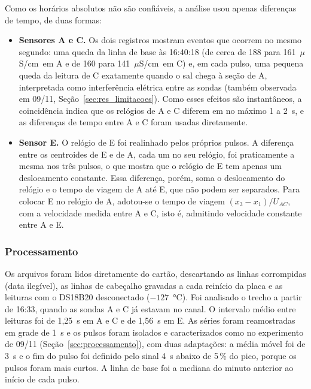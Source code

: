 \documentclass[12pt,a4paper]{article}
\providecommand{\uScm}{\ensuremath{\mu}S/cm}
\begin{document}
Como os horários absolutos não são confiáveis, a análise usou apenas diferenças de tempo, de duas formas:
\begin{itemize}
  \item \textbf{Sensores A e C.} Os dois registros mostram eventos que ocorrem no mesmo segundo: uma queda da linha de base às 16:40:18 (de cerca de 188 para 161~\uScm\ em A e de 160 para 141~\uScm\ em C) e, em cada pulso, uma pequena queda da leitura de C exatamente quando o sal chega à seção de A, interpretada como interferência elétrica entre as sondas (também observada em 09/11, Seção~\ref{sec:res_limitacoes}). Como esses efeitos são instantâneos, a coincidência indica que os relógios de A e C diferem em no máximo 1 a 2~s, e as diferenças de tempo entre A e C foram usadas diretamente.
  \item \textbf{Sensor E.} O relógio de E foi realinhado pelos próprios pulsos. A diferença entre os centroides de E e de A, cada um no seu relógio, foi praticamente a mesma nos três pulsos, o que mostra que o relógio de E tem apenas um deslocamento constante. Essa diferença, porém, soma o deslocamento do relógio e o tempo de viagem de A até E, que não podem ser separados. Para colocar E no relógio de A, adotou-se o tempo de viagem $(x_3 - x_1)/U_{AC}$, com a velocidade medida entre A e C, isto é, admitindo velocidade constante entre A e E.
\end{itemize}

\subsubsection{Processamento}
Os arquivos foram lidos diretamente do cartão, descartando as linhas corrompidas (data ilegível), as linhas de cabeçalho gravadas a cada reinício da placa e as leituras com o DS18B20 desconectado ($-127$~°C). Foi analisado o trecho a partir de 16:33, quando as sondas A e C já estavam no canal. O intervalo médio entre leituras foi de 1,25~s em A e C e de 1,56~s em E. As séries foram reamostradas em grade de 1~s e os pulsos foram isolados e caracterizados como no experimento de 09/11 (Seção~\ref{sec:processamento}), com duas adaptações: a média móvel foi de 3~s e o fim do pulso foi definido pelo sinal 4~s abaixo de 5\,\% do pico, porque os pulsos foram mais curtos. A linha de base foi a mediana do minuto anterior ao início de cada pulso.
\end{document}
